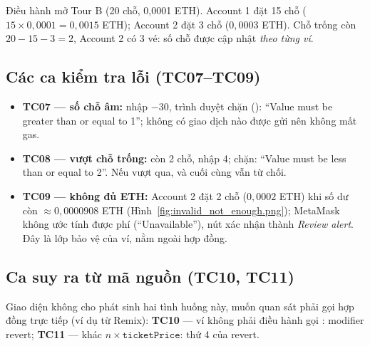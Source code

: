 Điều hành mở Tour B (20 chỗ, 0,0001 ETH). Account 1 đặt 15 chỗ ($15\times0{,}0001=0{,}0015$ ETH); Account 2 đặt 3 chỗ ($0{,}0003$ ETH).
Chỗ trống còn $20-15-3=2$, Account 2 có 3 vé: số chỗ được cập nhật \emph{theo từng ví}.



\subsection{Các ca kiểm tra lỗi (TC07--TC09)}

\begin{itemize}[leftmargin=1.5em]
    \item \textbf{TC07 --- số chỗ âm:} nhập $-30$, trình duyệt chặn (): ``Value must be greater than or equal to 1''; không có giao dịch nào được gửi nên không mất gas.
    \item \textbf{TC08 --- vượt chỗ trống:} còn 2 chỗ, nhập 4;  chặn: ``Value must be less than or equal to 2''. Nếu vượt qua,  và
          cuối cùng  vẫn từ chối.
    \item \textbf{TC09 --- không đủ ETH:} Account 2 đặt 2 chỗ ($0{,}0002$ ETH) khi số dư còn $\approx0{,}0000908$ ETH (Hình~\ref{fig:invalid_not_enough.png}); MetaMask không ước tính được phí
          (``Unavailable''), nút xác nhận thành \emph{Review alert}. Đây là lớp bảo vệ của ví, nằm ngoài hợp đồng.
\end{itemize}




\subsection{Ca suy ra từ mã nguồn (TC10, TC11)}
\label{sec:tc-code}

Giao diện không cho phát sinh hai tình huống này, muốn quan sát phải gọi hợp đồng trực tiếp (ví dụ từ Remix):
\textbf{TC10} --- ví không phải điều hành gọi : modifier  revert;
\textbf{TC11} ---  khác $n\times\texttt{ticketPrice}$:  thứ 4 của  revert.

